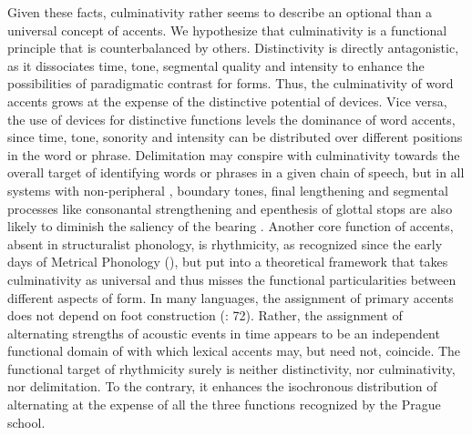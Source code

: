 \documentclass[output=paper]{LSP/langsci}
\begin{document}
Given these facts, culminativity rather seems to describe an optional than a universal concept of accents. We hypothesize that culminativity is a functional principle that is counterbalanced by others. Distinctivity is directly antagonistic, as it dissociates time, tone, segmental quality and intensity to enhance the possibilities of paradigmatic contrast for  forms. Thus, the culminativity of word accents grows at the expense of the distinctive potential of  devices. Vice versa, the use of  devices for distinctive functions levels the dominance of word accents, since time, tone, sonority and intensity can be distributed over different positions in the word or phrase. Delimitation may conspire with culminativity towards the overall target of identifying words or phrases in a given chain of speech, but in all systems with non-peripheral , boundary tones, final lengthening and segmental processes like consonantal strengthening and epenthesis of glottal stops are also likely to diminish the  saliency of the  bearing . Another core function of accents, absent in structuralist phonology, is rhythmicity, as recognized since the early days of Metrical Phonology (\citealt{Liberman1977,Hayes1995}), but put into a theoretical framework that takes culminativity as universal and thus misses the functional particularities between different aspects of  form. In many languages, the assignment of primary accents does not depend on foot construction (\citealt{Hulst1999}: 72). Rather, the assignment of alternating strengths of acoustic events in time appears to be an independent functional domain of  with which lexical accents may, but need not, coincide. The functional target of rhythmicity surely is neither distinctivity, nor culminativity, nor delimitation. To the contrary, it enhances the isochronous distribution of alternating  at the expense of all the three functions recognized by the Prague school.
\end{document}
